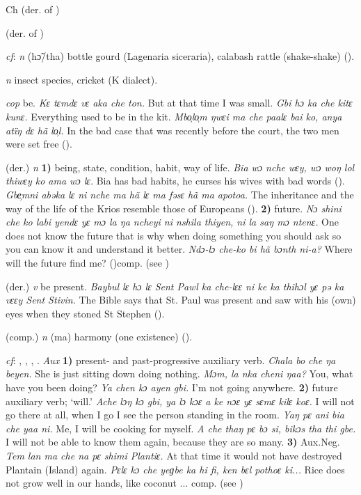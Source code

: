 \begin{letter}{Ch}
 (der. of ) 

 (der. of ) 

 \textit{cf}:  \textit{n} (hɔ̃/tha) bottle gourd (Lagenaria siceraria), calabash rattle (shake-shake) (\citealt{Pichl1967}).

 \textit{n} insect species, cricket (K dialect). 

 \textit{cop} be. \textit{Kɛ tɛmdɛ vɛ aka che ton.} But at that time I was small. \textit{Gbi hɔ ka che kitɛ kunɛ.} Everything used to be in the kit. \textit{Mbo̹lo̹m ŋwɛi ma che paalɛ bai ko, anya atïŋ dɛ hã lo̹l.} In the bad case that was recently before the court, the two men were set free (\citealt{Pichl1967}).

 (der.) \textit{n} \textbf{1)} being, state, condition, habit, way of life. \textit{Bia wɔ nche wɛy, wɔ woŋ lol thiwɛy ko ama wɔ lɛ.} Bia has bad habits, he curses his wives with bad words (\citealt{Pichl1967}). \textit{Gbe̹mni abəka lɛ ni nche ma hã lɛ ma fəsɛ hã ma apotoa.} The inheritance and the way of the life of the Krios resemble those of Europeans (\citealt{Pichl1967}). \textbf{2)} future. \textit{Nɔ shini che ko labi yendɛ yɛ mɔ la ŋa ncheyi ni nshila thiyen, ni la saŋ mɔ ntenɛ.} One does not know the future that is why when doing something you should ask so you can know it and understand it better. \textit{Ndɔ-lɔ che-ko bi hã bɔnth ni-a?} Where will the future find me? (\citealt{Pichl1967})comp.  (see )

 (der.) \textit{v} be present. \textit{Baybul lɛ hɔ lɛ Sent Pawl ka che-lɛɛ ni ke ka thihɔl yɛ pə ka vɛɛy Sent Stivin.} The Bible says that St. Paul was present and saw with his (own) eyes when they stoned St Stephen (\citealt{Pichl1967}).

 (comp.) \textit{n} (ma) harmony (one existence) (\citealt{Pichl1967}). 

 \textit{cf}: , , , . \textit{Aux} \textbf{1)} present- and past-progressive auxiliary verb. \textit{Chala bo che ŋa beyen.} She is just sitting down doing nothing. \textit{Mɔm, la nka cheni ŋaa?} You, what have you been doing? \textit{Ya chen kɔ ayen gbi.} I'm not going anywhere. \textbf{2)} future auxiliary verb; ‘will.' \textit{Ache lɔŋ kɔ gbi, ya lɔ kɔɛ a ke nɔɛ yɛ sɛmɛ kilɛ koɛ.} I will not go there at all, when I go I see the person standing in the room. \textit{Yaŋ pɛ ani bia che yaa ni.} Me, I will be cooking for myself. \textit{A che thaŋ pɛ bɔ si, bikɔs tha thi gbe.} I will not be able to know them again, because they are so many. \textbf{3)} Aux.Neg. \textit{Tem lan ma che na pɛ shimi Plantiɛ.} At that time it would not have destroyed Plantain (Island) again. \textit{Pɛlɛ kɔ che yeɡbe ka hi fi, ken bɛl pothoɛ ki...} Rice does not grow well in our hands, like coconut ... comp.  (see ) 


\end{letter}
